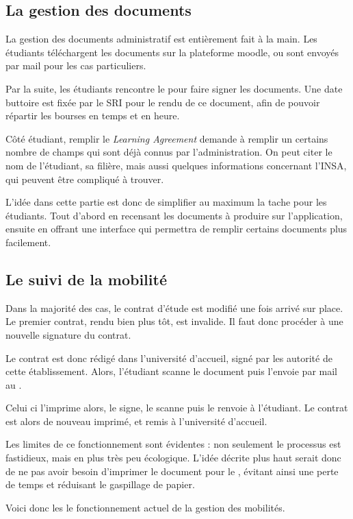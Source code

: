 		\subsection{La gestion  des documents}
		La gestion des documents administratif est entièrement fait à la main. Les étudiants téléchargent les documents sur la plateforme moodle, ou sont envoyés par mail pour les cas particuliers. 
                
                Par la suite, les étudiants rencontre le \ri pour faire signer les documents. Une date buttoire est fixée par le SRI pour le rendu de ce document, afin de pouvoir répartir les bourses en temps et en heure. 

\medbreak

Côté étudiant, remplir le \textit{Learning Agreement} demande à remplir un certains nombre de champs qui sont déjà connus par l'administration. On peut citer le nom de l'étudiant, sa filière, mais aussi quelques informations concernant l'INSA, qui peuvent être compliqué à trouver. 

\medbreak

L'idée dans cette partie est donc de simplifier au maximum la tache pour les étudiants. Tout d'abord en recensant les documents à produire sur l'application, ensuite en offrant une interface qui permettra de remplir certains documents plus facilement. 

\subsection{Le suivi de la mobilité}

Dans la majorité des cas, le contrat d'étude est modifié une fois arrivé sur place. Le premier contrat, rendu bien plus tôt, est invalide. Il faut donc procéder à une nouvelle signature du contrat. 

Le contrat est donc rédigé dans l'université d'accueil, signé par les autorité de cette établissement. Alors, l'étudiant scanne  le document puis l'envoie par mail au \ri. 

Celui ci l'imprime alors, le signe, le scanne puis le renvoie à l'étudiant. Le contrat est alors de nouveau imprimé, et remis à l'université d'accueil. 

\medbreak

Les limites de ce fonctionnement sont évidentes : non seulement le processus est fastidieux, mais en plus très peu écologique. L'idée décrite plus haut serait donc de ne pas avoir besoin d'imprimer le document pour le \ri, évitant ainsi une perte de temps et réduisant le gaspillage de papier. 

\bigbreak 

Voici donc les le fonctionnement actuel de la gestion des mobilités. 
